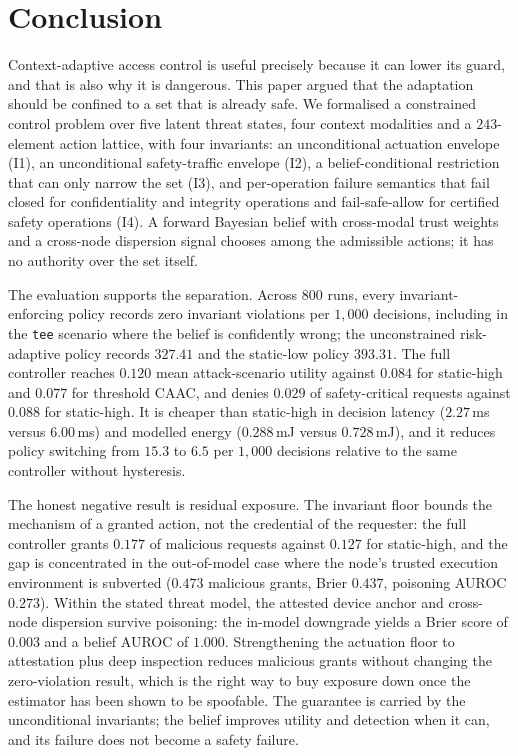 \section{Conclusion}
\label{sec:conclusion}

Context-adaptive access control is useful precisely because it can lower its
guard, and that is also why it is dangerous. This paper argued that the
adaptation should be confined to a set that is already safe. We formalised a
constrained control problem over five latent threat states, four context
modalities and a $243$-element action lattice, with four invariants: an
unconditional actuation envelope (I1), an unconditional safety-traffic envelope
(I2), a belief-conditional restriction that can only narrow the set (I3), and
per-operation failure semantics that fail closed for confidentiality and
integrity operations and fail-safe-allow for certified safety operations (I4).
A forward Bayesian belief with cross-modal trust weights and a cross-node
dispersion signal chooses among the admissible actions; it has no authority over
the set itself.

The evaluation supports the separation. Across $800$ runs, every
invariant-enforcing policy records zero invariant violations per $1{,}000$
decisions, including in the \texttt{tee} scenario where the belief is confidently
wrong; the unconstrained risk-adaptive policy records $327.41$ and the static-low
policy $393.31$. The full controller reaches $0.120$ mean attack-scenario utility
against $0.084$ for static-high and $0.077$ for threshold CAAC, and denies
$0.029$ of safety-critical requests against $0.088$ for static-high. It is
cheaper than static-high in decision latency ($2.27$\,ms versus $6.00$\,ms) and
modelled energy ($0.288$\,mJ versus $0.728$\,mJ), and it reduces policy switching
from $15.3$ to $6.5$ per $1{,}000$ decisions relative to the same controller
without hysteresis.

The honest negative result is residual exposure. The invariant floor bounds the
mechanism of a granted action, not the credential of the requester: the full
controller grants $0.177$ of malicious requests against $0.127$ for static-high,
and the gap is concentrated in the out-of-model case where the node's trusted
execution environment is subverted ($0.473$ malicious grants, Brier $0.437$,
poisoning AUROC $0.273$). Within the stated threat model, the attested device
anchor and cross-node dispersion survive poisoning: the in-model downgrade yields
a Brier score of $0.003$ and a belief AUROC of $1.000$. Strengthening the
actuation floor to attestation plus deep inspection reduces malicious grants
without changing the zero-violation result, which is the right way to buy
exposure down once the estimator has been shown to be spoofable. The guarantee is
carried by the unconditional invariants; the belief improves utility and detection
when it can, and its failure does not become a safety failure.

